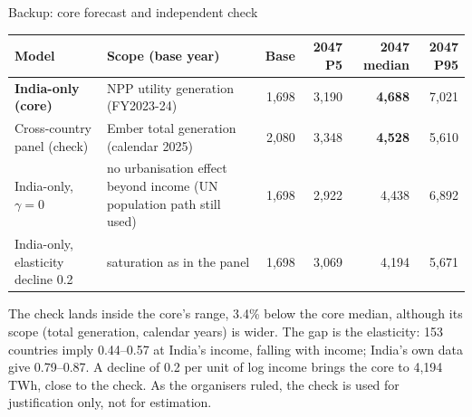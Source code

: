 \documentclass[aspectratio=169,10pt,t]{beamer}
\begin{document}
\appendix
\begin{frame}{Backup: core forecast and independent check}
\vspace{1mm}
{\fontsize{7.8}{9.5}\selectfont
\renewcommand{\arraystretch}{1.25}
\setlength{\tabcolsep}{4pt}
\begin{tabular}{@{}>{\raggedright\arraybackslash}p{3.7cm}>{\raggedright\arraybackslash}p{3.6cm}rrrr@{}}
\toprule
Model & Scope (base year) & Base & 2047 P5 & \textbf{2047 median} & 2047 P95\\
\midrule
\textbf{India-only (core)} & NPP utility generation (FY2023-24) & 1,698 & 3,190 & \textbf{4,688} & 7,021\\
Cross-country panel (check) & Ember total generation (calendar 2025) & 2,080 & 3,348 & \textbf{4,528} & 5,610\\
\midrule
India-only, $\gamma = 0$ & no urbanisation effect beyond income (UN population path still used) & 1,698 & 2,922 & 4,438 & 6,892\\
India-only, elasticity decline 0.2 & saturation as in the panel & 1,698 & 3,069 & 4,194 & 5,671\\
\bottomrule
\end{tabular}\par}
\vspace{2mm}
{\fontsize{8}{9.8}\selectfont
The check lands inside the core's range, 3.4\% below the core median, although its scope (total generation, calendar years) is wider. The gap is the elasticity: 153 countries imply 0.44--0.57 at India's income, falling with income; India's own data give 0.79--0.87. A decline of 0.2 per unit of log income brings the core to 4,194\,TWh, close to the check. As the organisers ruled, the check is used for justification only, not for estimation.\par}
\end{frame}
\end{document}
